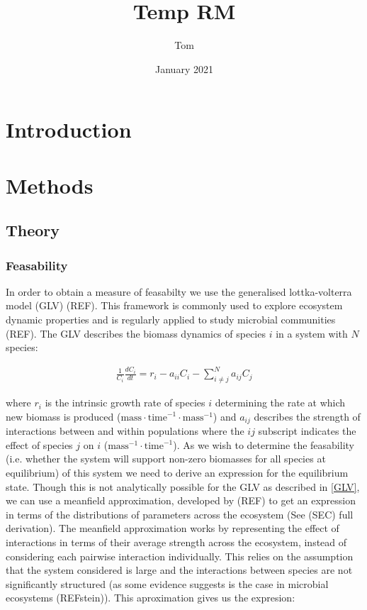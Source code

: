 \documentclass{article}
\title{Temp RM}
\author{Tom}
\date{January 2021}
\begin{document}
\maketitle

\section{Introduction}



\section{Methods}

\subsection{Theory}
\subsubsection{Feasability}
In order to obtain a measure of feasabilty we use the generalised lottka-volterra model (GLV) (REF). This framework is commonly used to explore ecosystem dynamic properties and is regularly applied to study microbial communities (REF). The GLV describes the biomass dynamics of species $i$ in a system with $N$ species:

\begin{align}
  \frac{1}{C_i} \frac{dC_i}{dt} = r_i - a_{ii} C_i - \sum^N_{i \neq j} a_{ij} C_j \label{GLV}
\end{align}

where $r_i$ is the intrinsic growth rate of species $i$ determining the rate at which new biomass is produced ($\text{mass} \cdot \text{time}^{-1} \cdot \text{mass}^{-1} $) and $a_{ij}$ describes the strength of interactions between and within populations where the $ij$ subscript indicates the effect of species $j$ on $i$ ($\text{mass}^{-1} \cdot \text{time}^{-1}$). As we wish to determine the feasability (i.e. whether the system will support non-zero biomasses for all species at equilibrium) of this system we need to derive an expression for the equilibrium state. Though this is not analytically possible for the GLV as described in \cref{GLV}, we can use a meanfield approximation, developed by (REF) to get an expression in terms of the distributions of parameters across the ecosystem (See (SEC) full derivation). The meanfield approximation works by representing the effect of interactions in terms of their average strength across the ecosystem, instead of considering each pairwise interaction individually. This relies on the assumption that the system considered is large and the interactions between species are not significantly structured (as some evidence suggests is the case in microbial ecosystems (REFstein)). This aproximation gives us the expresion:
\end{document}
